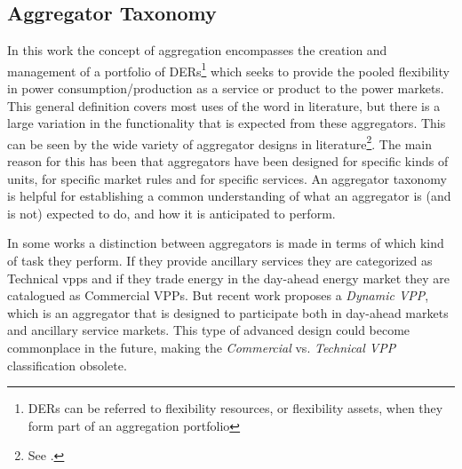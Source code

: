 \subsection{Aggregator Taxonomy} %
\label{sub:Aggregator Taxonomy}
In this work the concept of aggregation encompasses the creation and management of a portfolio of DERs\footnote{DERs can be referred to flexibility resources, or flexibility assets, when they form part of an aggregation portfolio} which seeks to provide the pooled flexibility in power consumption/production as a service or product to the power markets. This general definition covers most uses of the word in literature, but there is a large variation in the functionality that is expected from these aggregators. This can be seen by the wide variety of aggregator designs in literature\footnote{See \eg\cite{kok2005powermatcher,han2010development,sortomme2011optimal,costanzo2013coordination}.}. The main reason for this has been that aggregators have been designed for specific kinds of units, for specific market rules and for specific services. An aggregator taxonomy is helpful for establishing a common understanding of what an aggregator is (and is not) expected to do, and how it is anticipated to perform.

In some works a distinction between aggregators is made in terms of which kind of task they perform. If they provide ancillary services they are categorized as Technical \Glspl{vpp} and if they trade energy in the day-ahead energy market they are catalogued as Commercial VPPs. But recent work proposes a \emph{Dynamic VPP}, which is an aggregator that is designed to participate both in day-ahead markets and ancillary service markets. This type of advanced design could become commonplace in the future, making the \emph{Commercial} vs. \emph{Technical VPP} classification obsolete.

